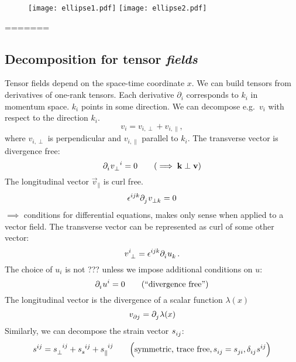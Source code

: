 \begin{figure}[hbtp!]
\centering
 \texttt{[image: ellipse1.pdf]}
 \texttt{[image: ellipse2.pdf]}
\caption{}
\end{figure}

=======

\subsection{Decomposition for tensor \emph{fields}}
Tensor fields depend on the space-time coordinate $x$.
We can build tensors from derivatives of one-rank tensors.
Each derivative $\partial_i$ corresponds to $k_i$ in momentum space.
$k_i$ points in some direction.
We can decompose e.g.\ $v_i$ with respect to the direction $k_i$.
\begin{equation}
    v_i = v_{i,\perp} + v_{i,\parallel},
\end{equation}
where $v_{i,\perp}$ is perpendicular and $v_{i,\parallel}$ parallel to $k_i$.
The transverse vector is divergence free:
\begin{equation}
    \tensor{\partial}{_i} \tensor{v}{_\perp^i} = 0 \qquad \left( \implies \vec{k} \perp \vec{v} \right)
\end{equation}
The longitudinal vector $\vec{v}_\parallel$ is curl free.
\begin{equation}
    \tensor{\epsilon}{^i^j^k} \tensor{\partial}{_j} \tensor{v}{_\perp_k} = 0
\end{equation}
$\implies$ conditions for differential equations, makes only sense when applied to a vector field.
The transverse vector can be represented as curl of some other vector:
\begin{equation}
    \tensor{v}{^i_\perp} = \tensor{\epsilon}{^i^j^k} \tensor{\partial}{_i} \tensor{u}{_k} \,.
\end{equation}
The choice of $u_i$ is not ??? unless we impose additional conditions on $u$:
\begin{equation}
    \tensor{\partial}{_i} \tensor{u}{^i} = 0 \qquad \left( \text{``divergence free''} \right)
\end{equation}
The longitudinal vector is the divergence of a scalar function $\lambda(x)$
\begin{equation}
    \tensor{v}{_\partial_j} = \tensor{\partial}{_j} \lambda(x)
\end{equation}
Similarly, we can decompose the strain vector $\tensor{s}{_i_j}$:
\begin{equation}
    \tensor{s}{^i^j} = \tensor{s}{_{\perp}^i^j} + \tensor{s}{_s^i^j} + \tensor{s}{_{\parallel}^i^j}
    \qquad \left( \text{symmetric, trace free}, \tensor{s}{_i_j} = \tensor{s}{_j_i}, \tensor{\delta}{_i_j} \tensor{s}{^i^j} \right)
\end{equation}
